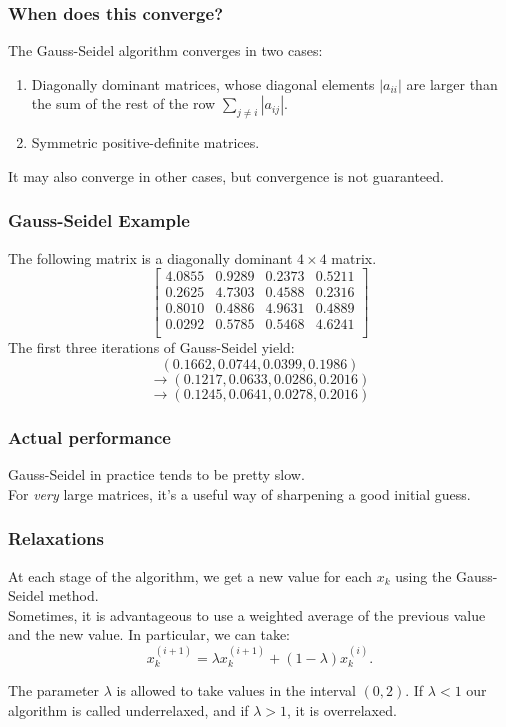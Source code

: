 \documentclass[12pt]{beamer}
\theoremstyle{definition}
\begin{document}
\begin{frame}
\frametitle{When does this converge?}

The Gauss-Seidel algorithm converges in two cases:
\begin{enumerate}
\item Diagonally dominant matrices, whose diagonal elements $|a_{ii}|$
are larger than the sum of the rest of the row $\sum_{j\neq i} |a_{ij}|$.
\item Symmetric positive-definite matrices.
\end{enumerate}
It may also converge in other cases, but convergence is not guaranteed.
\end{frame}

\begin{frame}
\frametitle{Gauss-Seidel Example}
The following matrix is a diagonally dominant $4\times 4$ matrix. 
\[ \left[\begin{array}{cccc}
    4.0855 &   0.9289 &   0.2373 &   0.5211\\
    0.2625  &  4.7303 &   0.4588 &   0.2316\\
    0.8010  &  0.4886 &   4.9631 &   0.4889\\
    0.0292 &   0.5785 &   0.5468 &   4.6241\\
\end{array}\right] \]
The first three iterations of Gauss-Seidel yield:
\[( 0.1662, 0.0744, 0.0399,  0.1986)\]
\[ \to ( 0.1217, 0.0633, 0.0286, 0.2016)\]
\[ \to ( 0.1245 , 0.0641, 0.0278, 0.2016)\]
\end{frame}




\begin{frame}
\frametitle{Actual performance}
Gauss-Seidel in practice tends to be pretty slow. \\[1cm]

For {\em very} large matrices, it's a useful way of sharpening
a good initial guess.
\end{frame}

\begin{frame}
\frametitle{Relaxations}

At each stage of the algorithm, we get a new value for each $x_k$
using the Gauss-Seidel method. \\

Sometimes, it is advantageous to use a weighted average of the previous
value and the new value. In particular, we can take:
\[ x_k^{(i+1)} = \lambda x_k^{(i+1)} + (1-\lambda)x_k^{(i)}.\]

The parameter $\lambda$ is allowed to take values in the interval $(0,2)$.
If $\lambda < 1$ our algorithm is called underrelaxed, and if $\lambda > 1$, it is overrelaxed. 
\end{frame}
\end{document}
